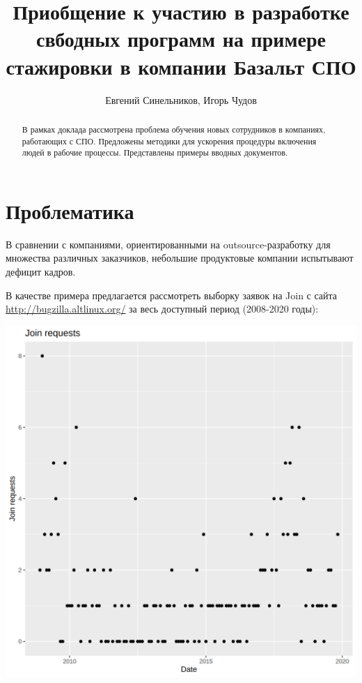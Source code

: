 \author{Евгений Синельников, Игорь Чудов}
\title{Приобщение к участию в разработке свбодных программ на примере
стажировки в компании Базальт СПО}
\maketitle

\begin{abstract}
  В рамках доклада рассмотрена проблема обучения новых
  сотрудников в компаниях, работающих с СПО. Предложены методики для
  ускорения процедуры включения людей в рабочие процессы. Представлены
  примеры вводных документов.
\end{abstract}


\section{Проблематика}

В сравнении с компаниями, ориентированными на outsource-разработку для
множества различных заказчиков, небольшие продуктовые компании
испытывают дефицит кадров.

В качестве примера предлагается рассмотреть выборку заявок на Join
с сайта \url{http://bugzilla.altlinux.org/} за весь доступный период
(2008-2020 годы):

\includegraphics[width=\textwidth,height=\textheight,keepaspectratio]{ggplot}

